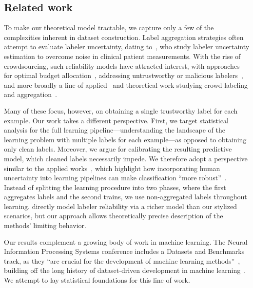 \subsection{Related work}
\label{sec:related-work}

To make our theoretical model tractable, we capture only a few of the complexities inherent in
dataset construction. Label aggregation strategies often attempt to
evaluate labeler uncertainty, dating to~\citet{DawidSk79}, who study
labeler uncertainty estimation to overcome noise in
clinical patient measurements. With the rise of
crowdsourcing, such reliability models have
attracted interest, with approaches for optimal budget
allocation~\cite{KargerOhSh14}, addressing untrustworthy or malicious
labelers~\cite{CharikarStVa17}, and more broadly a line of applied~\cite{DengDoSoLiLiFe09, RussakovskyDeSuKrSaMaHuKaKhBeBeFe15} and theoretical work
studying crowd labeling and aggregation~\cite{WhitehillWuBeMoRu09,
  WelinderBrPeBe10, RatnerBaEhFrWuRe17}.

Many of these focus, however, on obtaining a single
trustworthy label for each example. Our work takes a
different perspective.  First, we target statistical analysis for
the full learning pipeline---understanding the landscape of the
learning problem with multiple labels for each example---as opposed to
obtaining only clean labels. Moreover, we argue for
calibrating the resulting predictive model, which cleaned
labels necessarily impede. We therefore adopt a perspective similar to
the applied works~\citep{PetersonBaGrRu19,PlataniosAlXiMi20},
which highlight how incorporating human
uncertainty into learning pipelines can make classification ``more
robust''~\citep{PetersonBaGrRu19}.  Instead of splitting the learning
procedure into two phases, where the first aggregates labels and the second
trains, we use non-aggregated labels throughout
learning. \citet{PlataniosAlXiMi20} directly
model labeler reliability via a richer model than our stylized
scenarios, but our
approach allows theoretically precise description of the
methods' limiting
behavior.


Our results complement a growing body of work in machine learning.
%
The Neural Information Processing Systems conference
includes a Datasets and Benchmarks track, as they
``are crucial for the development of machine learning
methods''~\cite{BeygelzimerLiVaDa21},
%
building off the long history
of dataset-driven development in machine learning~\cite{HardtRe22}.
%
We attempt to lay statistical foundations for this line of work.

